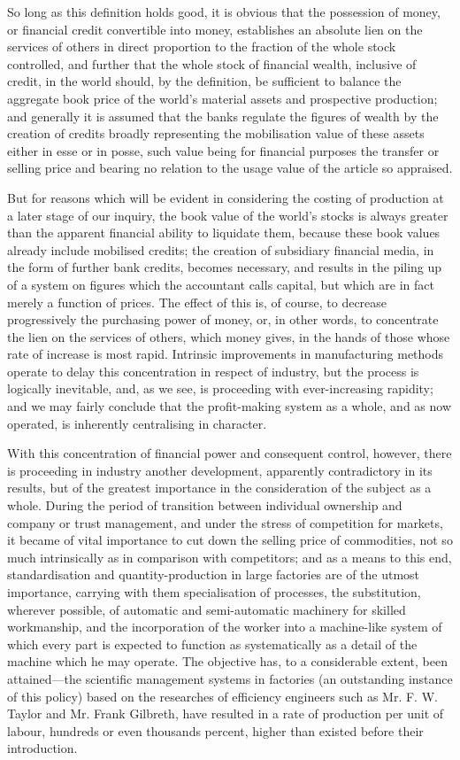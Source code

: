 \documentclass{book}
\begin{document}
So long as this definition holds good, it is obvious that the possession of money, or financial credit convertible into money, establishes an absolute lien on the services of others in direct proportion to the fraction of the whole stock controlled, and further that the whole stock of financial wealth, inclusive of credit, in the world should, by the definition, be sufficient to balance the aggregate book price of the world’s material assets and prospective production; and generally it is assumed that the banks regulate the figures of wealth by the creation of credits broadly representing the mobilisation value of these assets either in esse or in posse, such value being for financial purposes the transfer or selling price and bearing no relation to the usage value of the article so appraised.

But for reasons which will be evident in considering the costing of production at a later stage of our inquiry, the book value of the world’s stocks is always greater than the apparent financial ability to liquidate them, because these book values already include mobilised credits; the creation of subsidiary financial media, in the form of further bank credits, becomes necessary, and results in the piling up of a system on figures which the accountant calls capital, but which are in fact merely a function of prices. The effect of this is, of course, to decrease progressively the purchasing power of money, or, in other words, to concentrate the lien on the services of others, which money gives, in the hands of those whose rate of increase is most rapid. Intrinsic improvements in manufacturing methods operate to delay this concentration in respect of industry, but the process is logically inevitable, and, as we see, is proceeding with ever-increasing rapidity; and we may fairly conclude that the profit-making system as a whole, and as now operated, is inherently centralising in character.

With this concentration of financial power and consequent control, however, there is proceeding in industry another development, apparently contradictory in its results, but of the greatest importance in the consideration of the subject as a whole. During the period of transition between individual ownership and company or trust management, and under the stress of competition for markets, it became of vital importance to cut down the selling price of commodities, not so much intrinsically as in comparison with competitors; and as a means to this end, standardisation and quantity-production in large factories are of the utmost importance, carrying with them specialisation of processes, the substitution, wherever possible, of automatic and semi-automatic machinery for skilled workmanship, and the incorporation of the worker into a machine-like system of which every part is expected to function as systematically as a detail of the machine which he may operate. The objective has, to a considerable extent, been attained—the scientific management systems in factories (an outstanding instance of this policy) based on the researches of efficiency engineers such as Mr. F. W. Taylor and Mr. Frank Gilbreth, have resulted in a rate of production per unit of labour, hundreds or even thousands percent, higher than existed before their introduction.
\end{document}
